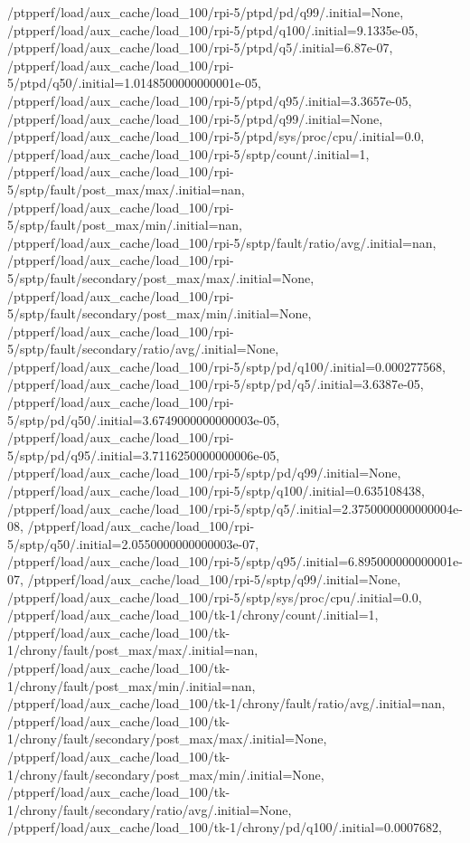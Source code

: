 {    /ptpperf/load/aux_cache/load_100/rpi-5/ptpd/pd/q99/.initial=None,
    /ptpperf/load/aux_cache/load_100/rpi-5/ptpd/q100/.initial=9.1335e-05,
    /ptpperf/load/aux_cache/load_100/rpi-5/ptpd/q5/.initial=6.87e-07,
    /ptpperf/load/aux_cache/load_100/rpi-5/ptpd/q50/.initial=1.0148500000000001e-05,
    /ptpperf/load/aux_cache/load_100/rpi-5/ptpd/q95/.initial=3.3657e-05,
    /ptpperf/load/aux_cache/load_100/rpi-5/ptpd/q99/.initial=None,
    /ptpperf/load/aux_cache/load_100/rpi-5/ptpd/sys/proc/cpu/.initial=0.0,
    /ptpperf/load/aux_cache/load_100/rpi-5/sptp/count/.initial=1,
    /ptpperf/load/aux_cache/load_100/rpi-5/sptp/fault/post_max/max/.initial=nan,
    /ptpperf/load/aux_cache/load_100/rpi-5/sptp/fault/post_max/min/.initial=nan,
    /ptpperf/load/aux_cache/load_100/rpi-5/sptp/fault/ratio/avg/.initial=nan,
    /ptpperf/load/aux_cache/load_100/rpi-5/sptp/fault/secondary/post_max/max/.initial=None,
    /ptpperf/load/aux_cache/load_100/rpi-5/sptp/fault/secondary/post_max/min/.initial=None,
    /ptpperf/load/aux_cache/load_100/rpi-5/sptp/fault/secondary/ratio/avg/.initial=None,
    /ptpperf/load/aux_cache/load_100/rpi-5/sptp/pd/q100/.initial=0.000277568,
    /ptpperf/load/aux_cache/load_100/rpi-5/sptp/pd/q5/.initial=3.6387e-05,
    /ptpperf/load/aux_cache/load_100/rpi-5/sptp/pd/q50/.initial=3.6749000000000003e-05,
    /ptpperf/load/aux_cache/load_100/rpi-5/sptp/pd/q95/.initial=3.7116250000000006e-05,
    /ptpperf/load/aux_cache/load_100/rpi-5/sptp/pd/q99/.initial=None,
    /ptpperf/load/aux_cache/load_100/rpi-5/sptp/q100/.initial=0.635108438,
    /ptpperf/load/aux_cache/load_100/rpi-5/sptp/q5/.initial=2.3750000000000004e-08,
    /ptpperf/load/aux_cache/load_100/rpi-5/sptp/q50/.initial=2.0550000000000003e-07,
    /ptpperf/load/aux_cache/load_100/rpi-5/sptp/q95/.initial=6.895000000000001e-07,
    /ptpperf/load/aux_cache/load_100/rpi-5/sptp/q99/.initial=None,
    /ptpperf/load/aux_cache/load_100/rpi-5/sptp/sys/proc/cpu/.initial=0.0,
    /ptpperf/load/aux_cache/load_100/tk-1/chrony/count/.initial=1,
    /ptpperf/load/aux_cache/load_100/tk-1/chrony/fault/post_max/max/.initial=nan,
    /ptpperf/load/aux_cache/load_100/tk-1/chrony/fault/post_max/min/.initial=nan,
    /ptpperf/load/aux_cache/load_100/tk-1/chrony/fault/ratio/avg/.initial=nan,
    /ptpperf/load/aux_cache/load_100/tk-1/chrony/fault/secondary/post_max/max/.initial=None,
    /ptpperf/load/aux_cache/load_100/tk-1/chrony/fault/secondary/post_max/min/.initial=None,
    /ptpperf/load/aux_cache/load_100/tk-1/chrony/fault/secondary/ratio/avg/.initial=None,
    /ptpperf/load/aux_cache/load_100/tk-1/chrony/pd/q100/.initial=0.0007682,
}
